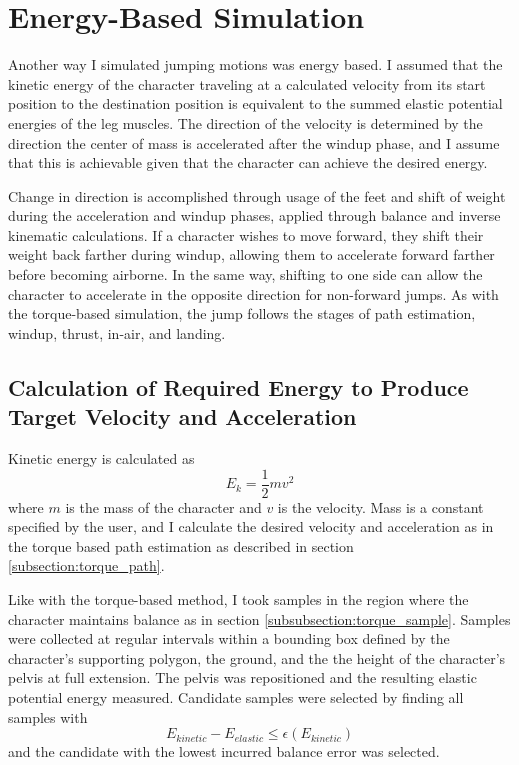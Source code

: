 \section{Energy-Based Simulation}
\label{section:energy}
Another way I simulated jumping motions was energy based.  I assumed that the kinetic energy of the character traveling at a calculated velocity from its start position to the destination position is equivalent to the summed elastic potential energies of the leg muscles.  The direction of the velocity is determined by the direction the center of mass is accelerated after the windup phase, and I assume that this is achievable given that the character can achieve the desired energy.  

Change in direction is accomplished through usage of the feet and shift of weight during the acceleration and windup phases, applied through balance and inverse kinematic calculations.  If a character wishes to move forward, they shift their weight back farther during windup, allowing them to accelerate forward farther before becoming airborne.  In the same way, shifting to one side can allow the character to accelerate in the opposite direction for non-forward jumps.  As with the torque-based simulation, the jump follows the stages of path estimation, windup, thrust, in-air, and landing.

\subsection{Calculation of Required Energy to Produce Target Velocity and Acceleration}
\label{subsection:energy_path}
Kinetic energy is calculated as \[ E_k = \frac{1}{2} m v^2 \] where $m$ is the mass of the character and $v$ is the velocity.  Mass is a constant specified by the user, and I calculate the desired velocity and acceleration as in the torque based path estimation as described in section \ref{subsection:torque_path}.

Like with the torque-based method, I took samples in the region where the character maintains balance as in section \ref{subsubsection:torque_sample}.  Samples were collected at regular intervals within a bounding box defined by the character's supporting polygon, the ground, and the the height of the character's pelvis at full extension.  The pelvis was repositioned and the resulting elastic potential energy measured.  Candidate samples were selected by finding all samples with \[ E_{kinetic} - E_{elastic} \le \epsilon(E_{kinetic})\] and the candidate with the lowest incurred balance error was selected.

